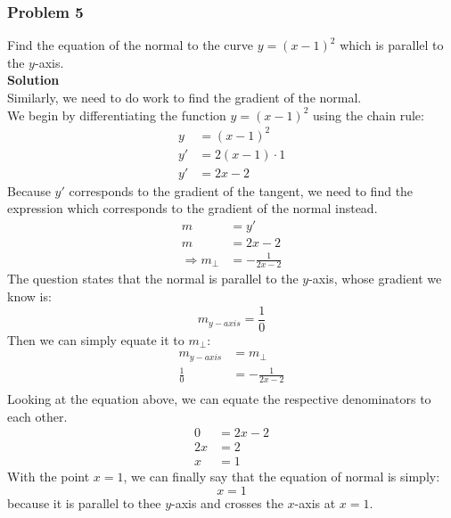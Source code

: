 \documentclass[hidelinks, a4paper, 12pt]{article}
\newcommand{\bd}{\textbf}
\newcommand{\n}{\\[\baselineskip]}
\newcommand{\thus}{\Rightarrow}
\begin{document}
            \subsubsection{Problem 5}
                Find the equation of the normal to the curve $y = (x-1)^2$ which is parallel to the $y$-axis.\n
                \bd{Solution}\n
                Similarly, we need to do work to find the gradient of the normal.\n
                We begin by differentiating the function $y = (x-1)^2$ using the chain rule:
                \[\begin{split}
                    y &= (x-1)^2\\
                    y' &= 2(x-1) \cdot 1\\
                    y' &= 2x - 2
                \end{split}\]
                Because $y'$ corresponds to the gradient of the tangent, we need to find the expression which corresponds
                to the gradient of the normal instead.
                \[\begin{split}
                    m &= y'\\
                    m &= 2x - 2\\
                    \thus m_\perp &= -\frac{1}{2x-2}
                \end{split}\]
                The question states that the normal is parallel to the $y$-axis, whose gradient we know is:
                \[m_{y-axis} = \frac{1}{0}\]
                Then we can simply equate it to $m_\perp$:
                \[\begin{split}
                    m_{y-axis} &= m_\perp\\
                    \frac{1}{0} &= -\frac{1}{2x-2}\\
                \end{split}\]
                Looking at the equation above, we can equate the respective denominators to each other.
                \[\begin{split}
                    0 &= 2x-2\\
                    2x &= 2\\
                    x &= 1
                \end{split}\]
                With the point $x=1$, we can finally say that the equation of normal is simply:
                \[x = 1\]
                because it is parallel to thee $y$-axis and crosses the $x$-axis at $x = 1$.
\end{document}
